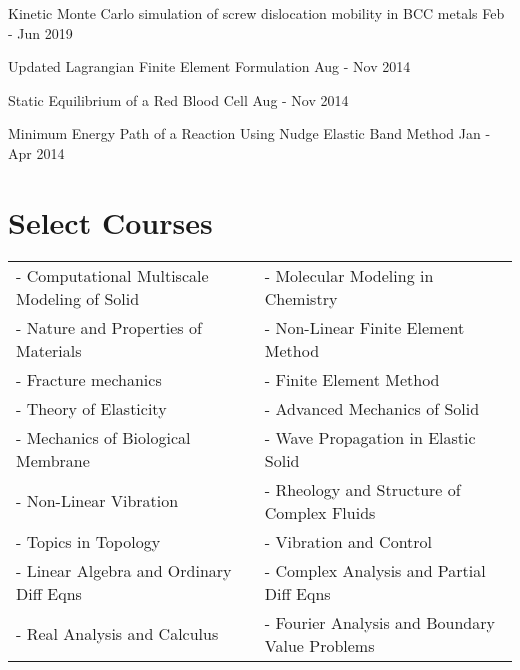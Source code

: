 \documentclass[margin,line]{resume}
\begin{document}
\begin{resume}
    Kinetic Monte Carlo simulation of screw dislocation mobility in BCC metals  \hfill \small{Feb - Jun 2019}

    \vspace{-0.3cm}
    Updated Lagrangian Finite Element Formulation  \hfill \small{Aug - Nov 2014}

    \vspace{-0.3cm}
    Static Equilibrium of a Red Blood Cell \hfill \small{Aug - Nov 2014}

    \vspace{-0.3cm}
    Minimum Energy Path of a Reaction Using Nudge Elastic Band Method \hfill \small{Jan - Apr 2014}




    \section{\mysidestyle Select Courses}

    \begin{tabular}{@{}p{7.5cm}p{7.5cm}}
        - Computational Multiscale Modeling of Solid & - Molecular Modeling in Chemistry              \\
        - Nature and Properties of Materials         & -  Non-Linear Finite Element Method            \\
        - Fracture mechanics                         & - Finite Element Method                        \\
        - Theory of Elasticity                       & - Advanced Mechanics of Solid                  \\
        - Mechanics of Biological Membrane           & - Wave Propagation in Elastic Solid            \\
        - Non-Linear Vibration                       & -	Rheology and Structure of Complex Fluids      \\
        - Topics in Topology                         & - Vibration and Control                        \\
        - Linear Algebra and Ordinary Diff Eqns      & - Complex Analysis and Partial Diff Eqns       \\
        - Real Analysis and Calculus                 & - Fourier Analysis and Boundary Value Problems
    \end{tabular}

    \clearpage

\end{resume}
\end{document}
